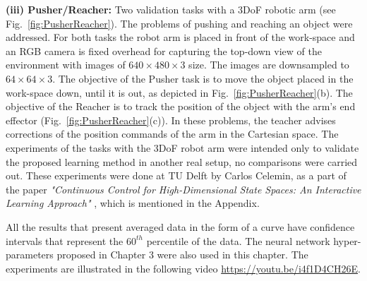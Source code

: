 \textbf{(iii) Pusher/Reacher:} Two validation tasks with a 3DoF robotic arm (see Fig.~\ref{fig:PusherReacher}). The problems of pushing  and reaching an object were addressed.  
For both tasks the robot arm is placed in front of the work-space and an RGB camera is fixed overhead for capturing the top-down view of the environment with images of $640\times480\times3$ size. The images are downsampled to $64\times64\times3$. The objective of the Pusher task is to move the object placed in the work-space down, until it is out, as depicted in Fig.~\ref{fig:PusherReacher}(b). The objective of the Reacher is to track the position of the object with the arm's end effector (Fig.~\ref{fig:PusherReacher}(c)). In these problems, the teacher advises corrections of the position commands of the arm in the Cartesian space. The experiments of the tasks with the 3DoF robot arm were intended only to validate the proposed learning method in another real setup, no comparisons were carried out. These experiments were done at TU Delft by Carlos Celemin, as a part of the paper \emph{"Continuous Control for High-Dimensional State Spaces: An Interactive Learning Approach"} \cite{perez2019continuous}, which is mentioned in the Appendix.

All the results that present averaged data in the form of a curve have confidence intervals that represent the $60^{th}$ percentile of the data.
The neural network hyper-parameters proposed in Chapter 3 were also used in this chapter. The experiments are illustrated in the following video \url{https://youtu.be/i4f1D4CH26E}. 

